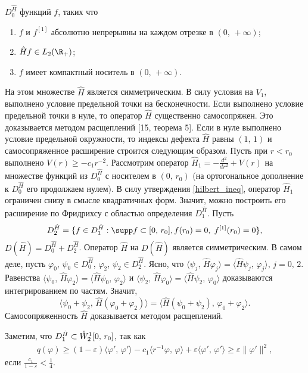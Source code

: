 \documentclass[a4paper
]{article}
\begin{document}
$D_0^{\hat H}$ функций $f$, таких что
\begin{enumerate}
\item $f$ и $f^{[1]}$ абсолютно непрерывны на каждом отрезке в $(0, \,
+\infty)$;
\item $\hat Hf\in L_2(\R_+)$;
\item $f$ имеет компактный носитель в $(0, \, +\infty)$.
\end{enumerate}
На этом множестве $\hat H$ является симметрическим. В силу условия
на $V_1$, выполнено условие предельной точки на бесконечности. Если
выполнено условие предельной точки в нуле, то оператор $\hat H$
существенно самосопряжен. Это доказывается методом расщеплений
[15, теорема 5]. Если в нуле выполнено условие предельной окружности,
то индексы дефекта $\hat H$ равны $(1, \, 1)$ и самосопряженное расширение
строится следующим образом. Пусть при $r<r_0$ выполнено $V(r)\ge
-c_1r^{-2}$. Рассмотрим оператор $\hat H_1=-\frac{d^2}{dr^2}+V(r)$ на
множестве функций из $D_0^{\hat H}$ с носителем в $(0, \, r_0)$ (на
ортогональное дополнение к $D_0^{\hat H}$ его продолжаем нулем). В
силу утверждения \ref{hilbert_ineq}, оператор $\hat H_1$ ограничен снизу в
смысле квадратичных форм. Значит, можно построить его расширение по Фридрихсу
с областью определения $D_1^{\hat H}$. Пусть $$D_2^{\hat H}=\{f\in D_1^{\hat H}:
\supp f\subset [0, \, r_0], f(r_0)=0, \; f^{[1]}(r_0)=0\},$$
$D(\hat H)=D_0^{\hat H}+D_2^{\hat H}$. Оператор $\hat H$ на $D(\hat H)$
является симметрическим. В самом деле, пусть $\varphi_0$, $\psi_0\in
D_0^{\hat H}$, $\varphi_2$, $\psi_2\in D_2^{\hat H}$. Ясно, что
$\langle \psi_j, \, \hat H\varphi_j\rangle=\langle \hat H\psi_j, \,
\varphi_j\rangle$, $j=0, \, 2$. Равенства $\langle \psi_0, \, \hat H
\varphi_2\rangle=\langle \hat H\psi_0, \, \varphi_2\rangle$ и
$\langle \psi_2, \, \hat H\varphi_0\rangle=\langle \hat H\psi_2, \,
\varphi_0\rangle$ доказываются интегрированием по частям. Значит,
$$\langle \psi_0+\psi_2, \, \hat H(\varphi_0+\varphi_2)\rangle=
\langle \hat H(\psi_0+\psi_2), \, \varphi_0+\varphi_2\rangle.$$
Самосопряженность $\hat H$ доказывается методом расщеплений. \par
Заметим, что $D_1^{\hat H}\subset \mathaccent'27 W^1_2[0, \, r_0]$, так как
\begin{align}
\label{q_phi_w12}
q(\varphi)\ge(1-\varepsilon)\langle \varphi', \, \varphi'\rangle
-c_1\langle r^{-1}\varphi, \, \varphi\rangle+\varepsilon\langle
\varphi', \, \varphi'\rangle\ge \varepsilon\|\varphi'\|^2,
\end{align}
если $\frac{c_1}{1-\varepsilon}<\frac14$. \par
\end{document}
